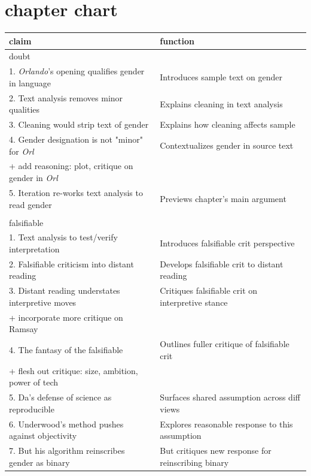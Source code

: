\documentclass[11pt]{article}
\author{fcalado}
\date{\today}
\title{}
\begin{document}
\tableofcontents

\section{chapter chart}
\label{sec:org521acf0}

\begin{center}
\begin{tabular}{ll}
claim & function\\[0pt]
\hline
doubt & \\[0pt]
1. \emph{Orlando}'s opening qualifies gender in language & Introduces sample text on gender\\[0pt]
2. Text analysis removes minor qualities & Explains cleaning in text analysis\\[0pt]
3. Cleaning would strip text of gender & Explains how cleaning affects sample\\[0pt]
4. Gender designation is not "minor" for \emph{Orl} & Contextualizes gender in source text\\[0pt]
+ add reasoning: plot, critique on gender in  \emph{Orl} & \\[0pt]
5. Iteration re-works text analysis to read gender & Previews chapter's main argument\\[0pt]
 & \\[0pt]
falsifiable & \\[0pt]
1. Text analysis to test/verify interpretation & Introduces falsifiable crit perspective\\[0pt]
2. Falsifiable criticism into distant reading & Develops falsifiable crit to distant reading\\[0pt]
3. Distant reading understates interpretive moves & Critiques falsifiable crit on interpretive stance\\[0pt]
+ incorporate more critique on Ramsay & \\[0pt]
4. The fantasy of the falsifiable & Outlines fuller critique of falsifiable crit\\[0pt]
+ flesh out critique: size, ambition, power of tech & \\[0pt]
5. Da's defense of science as reproducible & Surfaces shared assumption across diff views\\[0pt]
6. Underwood's method pushes against objectivity & Explores reasonable response to this assumption\\[0pt]
7. But his algorithm reinscribes gender as binary & But critiques new response for reinscribing binary\\[0pt]

\end{tabular}
\end{center}
\end{document}
